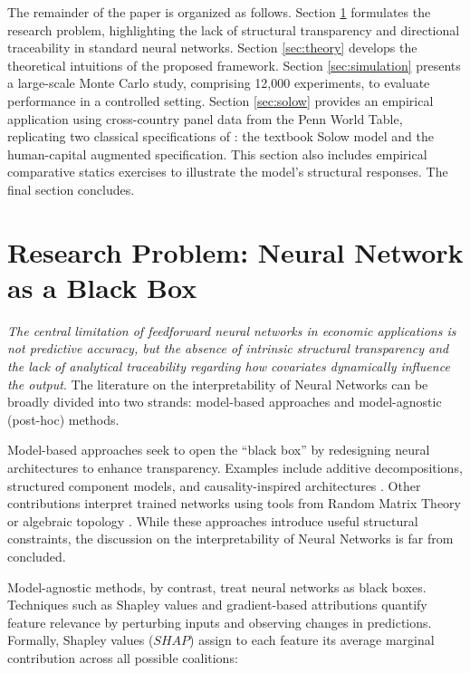 \documentclass[preprint,12pt,authoryear]{sn-jnl}
\begin{document}
The remainder of the paper is organized as follows. Section \ref{sec:research_problem} formulates the research problem, highlighting the lack of structural transparency and directional traceability in standard neural networks. Section \ref{sec:theory} develops the theoretical intuitions of the proposed framework. Section \ref{sec:simulation} presents a large-scale Monte Carlo study, comprising 12,000 experiments, to evaluate performance in a controlled setting. Section \ref{sec:solow} provides an empirical application using cross-country panel data from the Penn World Table, replicating two classical specifications of \cite{mankiw1992contribution}: the textbook Solow model and the human-capital augmented specification. This section also includes empirical comparative statics exercises to illustrate the model's structural responses. The final section concludes.

\section{Research Problem: Neural Network as a Black Box} \label{sec:research_problem}

\textit{The central limitation of feedforward neural networks in economic applications is not predictive accuracy, but the absence of intrinsic structural transparency and the lack of analytical traceability regarding how covariates dynamically influence the output}. The literature on the interpretability of Neural Networks can be broadly divided into two strands: model-based approaches and model-agnostic (post-hoc) methods.

Model-based approaches seek to open the “black box” by redesigning neural architectures to enhance transparency. Examples include additive decompositions, structured component models, and causality-inspired architectures \citep{yang2021gami, wu2025explainable, cho2024deep}. Other contributions interpret trained networks using tools from Random Matrix Theory or algebraic topology \citep{martin2021implicit, spannaus2024topological}. While these approaches introduce useful structural constraints, the discussion on the interpretability of Neural Networks is far from concluded.

Model-agnostic methods, by contrast, treat neural networks as black boxes. Techniques such as Shapley values and gradient-based attributions quantify feature relevance by perturbing inputs and observing changes in predictions. Formally, Shapley values ($SHAP$) assign to each feature its average marginal contribution across all possible coalitions:
\end{document}
